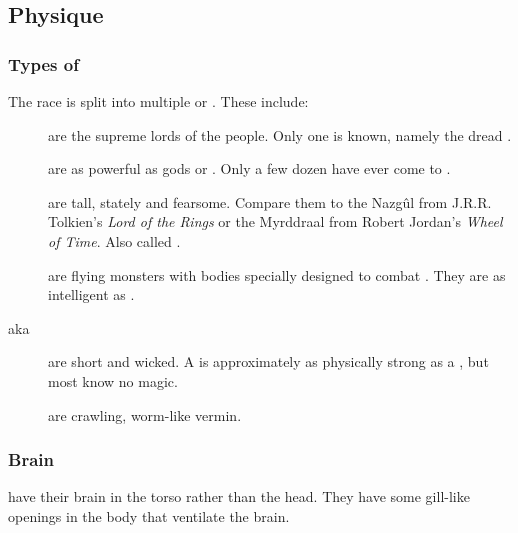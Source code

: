 \subsection{Physique}





\subsubsection{Types of \banes}
The \SitraAchra race is split into multiple  or . 
These include: 

\begin{description}
  \item[\Banekings] are the supreme lords of the \bane{} people. 
    Only one \baneking{} is known, namely the dread . 
  
  \item[\Banelords] are as powerful as gods or \dragons. 
    Only a few dozen \banelords{} have ever come to \Miith{}. 
    
  \item[\Greaterbanes] are tall, stately and fearsome. 
    Compare them to the Nazg\^ul from J.R.R. Tolkien's \emph{Lord of the Rings} or the Myrddraal from Robert Jordan's \emph{Wheel of Time}. 
    Also called \quo{\baneknights}. 
    
  \item[\Screamers] are flying monsters with bodies specially designed to combat \dragons.
    They are as intelligent as \lesserbanes. 
    
  \item[\Lesserbanes aka \stalkers] are short and wicked. 
    A \lesserbane{} is approximately as physically strong as a \resphan, but most \lesserbanes{} know no magic. 
    
    
  \item[\Banespawns] are crawling, worm-like vermin. 
\end{description}





\subsubsection{Brain}
\Banes{} have their brain in the torso rather than the head. 
They have some gill-like openings in the body that ventilate the brain. 

